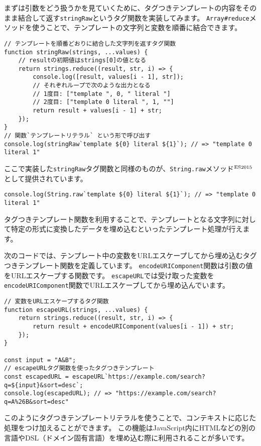 まずは引数をどう扱うかを見ていくために、タグつきテンプレートの内容をそのまま結合して返す\texttt{stringRaw}というタグ関数を実装してみます。
\texttt{Array\#reduce}メソッドを使うことで、テンプレートの文字列と変数を順番に結合できます。

\begin{lstlisting}
// テンプレートを順番どおりに結合した文字列を返すタグ関数
function stringRaw(strings, ...values) {
    // resultの初期値はstrings[0]の値となる
    return strings.reduce((result, str, i) => {
        console.log([result, values[i - 1], str]);
        // それぞれループで次のような出力となる
        // 1度目: ["template ", 0, " literal "]
        // 2度目: ["template 0 literal ", 1, ""]
        return result + values[i - 1] + str;
    }); 
}
// 関数`テンプレートリテラル` という形で呼び出す
console.log(stringRaw`template ${0} literal ${1}`); // => "template 0 literal 1"
\end{lstlisting}

ここで実装した\texttt{stringRaw}タグ関数と同様のものが、\texttt{String.raw}メソッド{$^{\rm ES2015}$}として提供されています。

\begin{lstlisting}
console.log(String.raw`template ${0} literal ${1}`); // => "template 0 literal 1"
\end{lstlisting}

タグつきテンプレート関数を利用することで、テンプレートとなる文字列に対して特定の形式に変換したデータを埋め込むといったテンプレート処理が行えます。

次のコードでは、テンプレート中の変数をURLエスケープしてから埋め込むタグつきテンプレート関数を定義しています。
\texttt{encodeURIComponent}関数は引数の値をURLエスケープする関数です。
\texttt{escapeURL}では受け取った変数を\texttt{encodeURIComponent}関数でURLエスケープしてから埋め込んでいます。

\begin{lstlisting}
// 変数をURLエスケープするタグ関数
function escapeURL(strings, ...values) {
    return strings.reduce((result, str, i) => {
        return result + encodeURIComponent(values[i - 1]) + str;
    });  
}

const input = "A&B";
// escapeURLタグ関数を使ったタグつきテンプレート
const escapedURL = escapeURL`https://example.com/search?q=${input}&sort=desc`;
console.log(escapedURL); // => "https://example.com/search?q=A%26B&sort=desc"
\end{lstlisting}

このようにタグつきテンプレートリテラルを使うことで、コンテキストに応じた処理をつけ加えることができます。
この機能はJavaScript内にHTMLなどの別の言語やDSL（ドメイン固有言語）を埋め込む際に利用されることが多いです。

